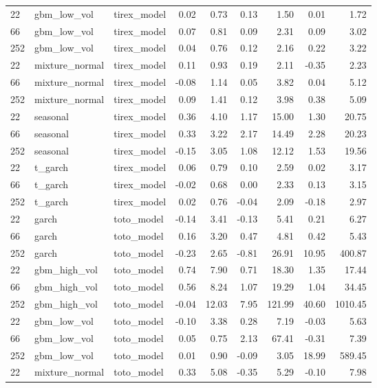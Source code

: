 {\begin{tabular}{lllrrrrrr}
\midrule
22 & gbm\_low\_vol & tirex\_model & 0.02 & 0.73 & 0.13 & 1.50 & 0.01 & 1.72 \\
66 & gbm\_low\_vol & tirex\_model & 0.07 & 0.81 & 0.09 & 2.31 & 0.09 & 3.02 \\
252 & gbm\_low\_vol & tirex\_model & 0.04 & 0.76 & 0.12 & 2.16 & 0.22 & 3.22 \\
\midrule
22 & mixture\_normal & tirex\_model & 0.11 & 0.93 & 0.19 & 2.11 & -0.35 & 2.23 \\
66 & mixture\_normal & tirex\_model & -0.08 & 1.14 & 0.05 & 3.82 & 0.04 & 5.12 \\
252 & mixture\_normal & tirex\_model & 0.09 & 1.41 & 0.12 & 3.98 & 0.38 & 5.09 \\
\midrule
22 & seasonal & tirex\_model & 0.36 & 4.10 & 1.17 & 15.00 & 1.30 & 20.75 \\
66 & seasonal & tirex\_model & 0.33 & 3.22 & 2.17 & 14.49 & 2.28 & 20.23 \\
252 & seasonal & tirex\_model & -0.15 & 3.05 & 1.08 & 12.12 & 1.53 & 19.56 \\
\midrule
22 & t\_garch & tirex\_model & 0.06 & 0.79 & 0.10 & 2.59 & 0.02 & 3.17 \\
66 & t\_garch & tirex\_model & -0.02 & 0.68 & 0.00 & 2.33 & 0.13 & 3.15 \\
252 & t\_garch & tirex\_model & 0.02 & 0.76 & -0.04 & 2.09 & -0.18 & 2.97 \\
\midrule
22 & garch & toto\_model & -0.14 & 3.41 & -0.13 & 5.41 & 0.21 & 6.27 \\
66 & garch & toto\_model & 0.16 & 3.20 & 0.47 & 4.81 & 0.42 & 5.43 \\
252 & garch & toto\_model & -0.23 & 2.65 & -0.81 & 26.91 & 10.95 & 400.87 \\
\midrule
22 & gbm\_high\_vol & toto\_model & 0.74 & 7.90 & 0.71 & 18.30 & 1.35 & 17.44 \\
66 & gbm\_high\_vol & toto\_model & 0.56 & 8.24 & 1.07 & 19.29 & 1.04 & 34.45 \\
252 & gbm\_high\_vol & toto\_model & -0.04 & 12.03 & 7.95 & 121.99 & 40.60 & 1010.45 \\
\midrule
22 & gbm\_low\_vol & toto\_model & -0.10 & 3.38 & 0.28 & 7.19 & -0.03 & 5.63 \\
66 & gbm\_low\_vol & toto\_model & 0.05 & 0.75 & 2.13 & 67.41 & -0.31 & 7.39 \\
252 & gbm\_low\_vol & toto\_model & 0.01 & 0.90 & -0.09 & 3.05 & 18.99 & 589.45 \\
\midrule
22 & mixture\_normal & toto\_model & 0.33 & 5.08 & -0.35 & 5.29 & -0.10 & 7.98 \\

\end{tabular}}
